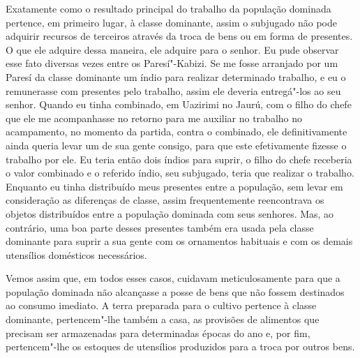Exatamente como o resultado principal do trabalho da população dominada
pertence, em primeiro lugar, à classe dominante, assim o subjugado não
pode adquirir recursos de terceiros através da troca de bens ou em forma
de presentes. O que ele adquire dessa maneira, ele adquire para o
senhor. Eu pude observar esse fato diversas vezes entre os
Paresí"-Kabizi. Se me fosse arranjado por um Paresí da classe dominante
um índio para realizar determinado trabalho, e eu o remunerasse com
presentes pelo trabalho, assim ele deveria entregá"-los ao seu senhor.
Quando eu tinha combinado, em Uazirimi no Jaurú, com o filho do chefe
que ele me acompanhasse no retorno para me auxiliar no trabalho no
acampamento, no momento da partida, contra o combinado, ele
definitivamente ainda queria levar um de sua gente consigo, para que
este efetivamente fizesse o trabalho por ele. Eu teria então dois índios
para suprir, o filho do chefe receberia o valor combinado e o referido
índio, seu subjugado, teria que realizar o trabalho. Enquanto eu tinha
distribuído meus presentes entre a população, sem levar em consideração
as diferenças de classe, assim frequentemente reencontrava os objetos
distribuídos entre a população dominada com seus senhores. Mas, ao
contrário, uma boa parte desses presentes também era usada pela classe
dominante para suprir a sua gente com os ornamentos habituais e com os
demais utensílios domésticos necessários.

Vemos assim que, em todos esses casos, cuidavam meticulosamente para
que a população dominada não alcançasse a posse de bens que não fossem
destinados ao consumo imediato. A terra preparada para o cultivo
pertence à classe dominante, pertencem"-lhe também a casa, as provisões
de alimentos que precisam ser armazenadas para determinadas épocas do
ano e, por fim, pertencem"-lhe os estoques de utensílios produzidos para
a troca por outros bens.

